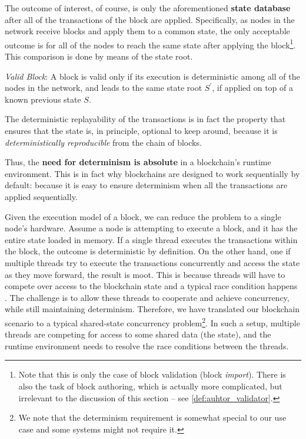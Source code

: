 The outcome of interest, of course, is only the aforementioned \textbf{state database} after all of
the transactions of the block are applied. Specifically, as nodes in the network receive blocks and
apply them to a common state, the only acceptable outcome is for all of the nodes to reach the same
state after applying the block\footnote{Note that this is only the case of block validation (block
\textit{import}). There is also the task of block authoring, which is actually more complicated, but
irrelevant to the discussion of this section -- see \ref{def:auhtor_validator}.}. This comparison is
done by means of the state root.

\begin{definition} \label{def:valid_block} \textit{Valid Block}: A block is valid only if its
	execution is deterministic among all of the nodes in the network, and leads to the same state
	root $S^{'}$, if applied on top of a known previous state $S$.
\end{definition}

\begin{remark}
	The deterministic replayability of the transactions is in fact the property that ensures that
	the state is, in principle, optional to keep around, because it is \textit{deterministically
	reproducible} from the chain of blocks.
\end{remark}

Thus, the \textbf{need for determinism is absolute} in a blockchain's runtime environment. This is
in fact why blockchains are designed to work sequentially by default: because it is easy to ensure
determinism when all the transactions are applied sequentially.

Given the execution model of a block, we can reduce the problem to a single node's hardware. Assume
a node is attempting to execute a block, and it has the entire state loaded in memory. If a single
thread executes the transactions within the block, the outcome is deterministic by definition. On
the other hand, one if multiple threads try to execute the transactions concurrently and access the
state as they move forward, the result is moot. This is because threads will have to compete over
access to the blockchain state and a typical race condition happens \cite{14:00-17:00ISOIEC9899}.
The challenge is to allow these threads to cooperate and achieve concurrency, while still
maintaining determinism. Therefore, we have translated our blockchain scenario to a typical
shared-state concurrency problem\footnote{We note that the determinism requirement is somewhat
special to our use case and some systems might not require it.}. In such a setup, multiple threads
are competing for access to some shared data (the state), and the runtime environment needs to
resolve the race conditions between the threads.

